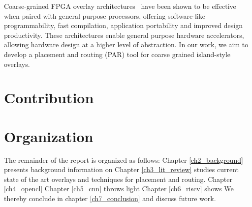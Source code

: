 Coarse-grained FPGA overlay architectures~\cite{plessl_zippy_2005,bergmann_quku:_2013,coole_intermediate_2010,capalija_high-performance_2013,govindaraju2012dyser,fccm2015-jain,heart2015-jain,liu_soft_2013,cong2014fully} have been shown to be effective when paired with general purpose processors, offering software-like programmability, fast compilation, application portability and improved design productivity.
These architectures enable general purpose hardware accelerators, allowing hardware design at a higher level of abstraction.
In our work, we aim to develop a placement and routing (PAR) tool for coarse grained island-style overlays.


\section{Contribution}


\section{Organization}
The remainder of the report is organized as follows: 
Chapter \ref{ch2_background} presents background information on
Chapter \ref{ch3_lit_review} studies current state of the art overlays and techniques for placement and routing.
Chapter \ref{ch4_opencl} 
Chapter \ref{ch5_cnn} throws light 
Chapter \ref{ch6_riscv} shows 
We thereby conclude in chapter \ref{ch7_conclusion} and discuss future work.
